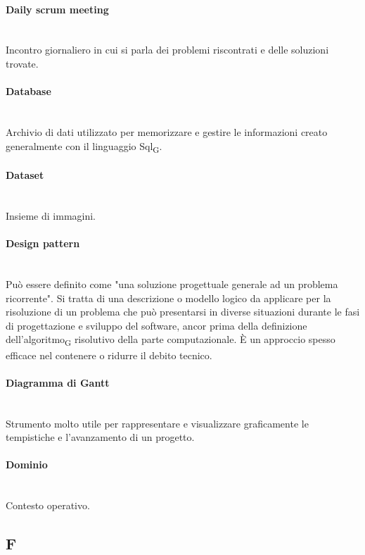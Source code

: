 \paragraph{Daily scrum meeting}~\smallskip \\
Incontro giornaliero in cui si parla dei problemi riscontrati e delle soluzioni trovate.

\paragraph{Database}~\smallskip \\
Archivio di dati utilizzato per memorizzare e gestire le informazioni creato generalmente con il linguaggio Sql\textsubscript{G}.

\paragraph{Dataset}~\smallskip \\
Insieme di immagini.

\paragraph{Design pattern}~\smallskip \\
Può essere definito come "una soluzione progettuale generale ad un problema ricorrente".
Si tratta di una descrizione o modello logico da applicare per la risoluzione di un problema che può 
presentarsi in diverse situazioni durante le fasi di progettazione e sviluppo del software, ancor prima della definizione 
dell'algoritmo\textsubscript{G} risolutivo della parte computazionale. È un approccio spesso efficace nel contenere o ridurre il debito tecnico.

\paragraph{Diagramma di Gantt}~\smallskip \\
Strumento molto utile per rappresentare e visualizzare graficamente le tempistiche e l'avanzamento di un progetto.

\paragraph{Dominio}~\smallskip \\
Contesto operativo.

\newpage
{}
\subsection*{F}

